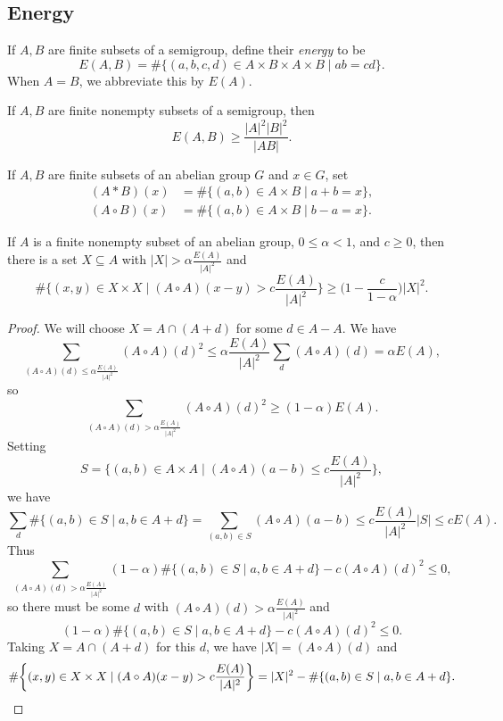 \subsection{Energy}

\begin{defn} If $A,B$ are finite subsets of a semigroup, define their \emph{energy} to be
\[
E(A,B) = \#\{(a,b,c,d)\in A\times B \times A\times B \mid ab = cd\}.
\]
When $A=B$, we abbreviate this by $E(A)$.
\end{defn}

\begin{prop} If $A,B$ are finite nonempty subsets of a semigroup, then
\[
E(A,B) \ge \frac{|A|^2|B|^2}{|AB|}.
\]
\end{prop}

\begin{defn} If $A,B$ are finite subsets of an abelian group $G$ and $x\in G$, set
\begin{align*}
(A*B)(x) &= \#\{(a,b)\in A\times B \mid a+b = x\},\\
(A\circ B)(x) &= \#\{(a,b)\in A\times B \mid b-a = x\}.
\end{align*}
\end{defn}

\begin{lem}\label{sanders} If $A$ is a finite nonempty subset of an abelian group, $0 \le \alpha < 1$, and $c \ge 0$, then there is a set $X\subseteq A$ with $|X| > \alpha\frac{E(A)}{|A|^2}$ and
\[
\#\bigg\{(x,y)\in X\times X \mid (A\circ A)(x-y) > c\frac{E(A)}{|A|^2}\bigg\} \ge \bigg(1-\frac{c}{1-\alpha}\bigg)|X|^2.
\]
\end{lem}
\begin{proof} We will choose $X = A\cap (A+d)$ for some $d\in A-A$. We have
\[
\sum_{(A\circ A)(d) \le \alpha\frac{E(A)}{|A|^2}} (A\circ A)(d)^2 \le \alpha\frac{E(A)}{|A|^2}\sum_d (A\circ A)(d) = \alpha E(A),
\]
so
\[
\sum_{(A\circ A)(d) > \alpha\frac{E(A)}{|A|^2}} (A\circ A)(d)^2 \ge (1-\alpha)E(A).
\]
Setting
\[
S = \bigg\{(a,b)\in A\times A \mid (A\circ A)(a-b) \le c\frac{E(A)}{|A|^2}\bigg\},
\]
we have
\[
\sum_d \#\{(a,b) \in S \mid a,b \in A+d\} = \sum_{(a,b)\in S} (A\circ A)(a-b) \le c\frac{E(A)}{|A|^2}|S| \le cE(A).
\]
Thus
\[
\sum_{(A\circ A)(d) > \alpha\frac{E(A)}{|A|^2}} (1-\alpha)\#\{(a,b) \in S \mid a,b \in A+d\} - c(A\circ A)(d)^2 \le 0,
\]
so there must be some $d$ with $(A\circ A)(d) > \alpha\frac{E(A)}{|A|^2}$ and
\[
(1-\alpha)\#\{(a,b) \in S \mid a,b \in A+d\} - c(A\circ A)(d)^2 \le 0.
\]
Taking $X = A\cap (A+d)$ for this $d$, we have $|X| = (A\circ A)(d)$ and
\[
\#\bigg\{(x,y)\in X\times X \mid (A\circ A)(x-y) > c\frac{E(A)}{|A|^2}\bigg\} = |X|^2 - \#\{(a,b) \in S \mid a,b \in A+d\}.\qedhere
\]
\end{proof}

